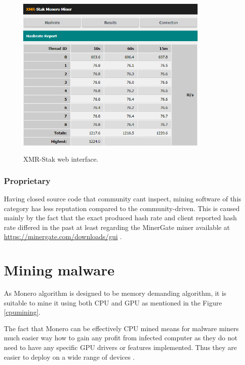 \documentclass[
  printed, %
  table,   %
  lof,     %
  lot,     %
           oneside, color
]{fithesis3}
\begin{document}
\begin{figure}[H]
\begin{center}

    \vspace{-0.8em}
 \includegraphics[trim={0 0 0 0},clip,width=0.85\textwidth]{Screenshot_9.png}
    \caption{XMR-Stak web interface.}
    \vspace{-1.5em}
    \label{pic:withoutresdrawable}
\end{center}
    \end{figure}
    
\subsubsection{Proprietary}
Having closed source code that community cant inspect, mining software of this category has less reputation compared to the community-driven. This is caused mainly by the fact that the exact produced hash rate and client reported hash rate differed in the past at least regarding the MinerGate miner available at \url{https://minergate.com/downloads/gui} .

\section{Mining malware }
\vspace{-0.2em}
As Monero algorithm is designed to be memory demanding algorithm, it is suitable to mine it using both CPU and GPU as mentioned in the Figure \ref{cpumining}. 

The fact that Monero can be effectively CPU mined means for malware miners much easier way how to gain any profit from infected computer as they do not need to have any specific GPU drivers or features implemented. Thus they are easier to deploy on a wide range of devices \cite{le2018swimming}.
\vspace{-0.6em}
\end{document}
